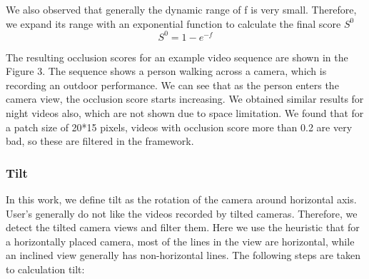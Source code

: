 \documentclass{sig-alternate}
\begin{document}
We also observed that generally the dynamic range of f is very small. Therefore, we expand its range with an exponential function to calculate the ﬁnal score \(S^0\)
\begin{equation}
S^0 = 1 - e^{−f}
\end{equation}

 The resulting occlusion scores for an example video sequence are shown in the Figure 3. The sequence shows a person walking across a camera, which is recording an outdoor performance. We can see that as the person enters the camera view, the occlusion score starts increasing. We obtained similar results for night videos also, which are not shown due to space limitation. We found that for a patch size of 20*15 pixels, videos with occlusion score more than 0.2 are very bad, so these are ﬁltered in the framework. 

\subsubsection{Tilt}
In this work, we define tilt as the rotation of the camera around horizontal axis. User's generally do not like the videos recorded by tilted cameras. Therefore, we detect the tilted camera views and filter them. Here we use the heuristic that for a horizontally placed camera, most of the lines in the view are horizontal, while an inclined view generally has non-horizontal lines. The following steps are taken to calculation tilt:
\end{document}
